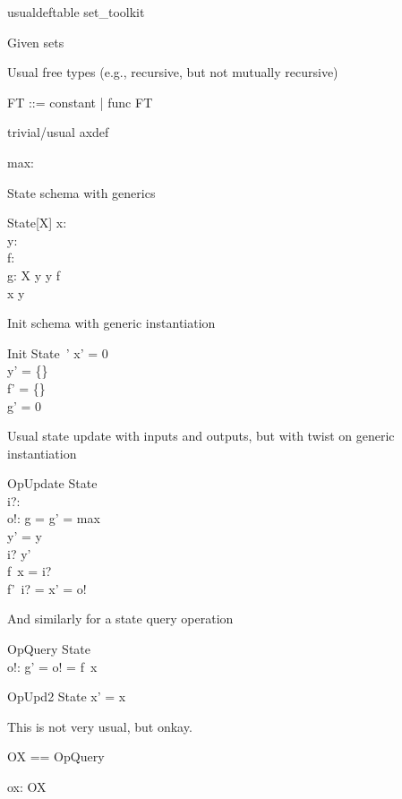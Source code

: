 \documentclass{article}
\begin{document}
\begin{zsection}
\SECTION usualdeftable \parents set\_toolkit
\end{zsection}

Given sets
\begin{zed}
   [G, H]
\end{zed}

Usual free types (e.g., recursive, but not mutually recursive)
\begin{zed}
   FT ::= constant | func \ldata \nat \cross FT \rdata
\end{zed}

trivial/usual axdef
\begin{axdef}
   max: \nat
\end{axdef}

State schema with generics
\begin{schema}{State}[X]
   x: \nat \\
   y: \power~\nat \\
   f: \nat \fun \nat \\
   g: X
\where
   y \cross y \subseteq f \\
   x \in y
\end{schema}

Init schema with generic instantiation
\begin{schema}{Init}
   State~'
\where
   x' = 0 \\
   y' = \{\} \\
   f' = \{\} \\
   g' = 0
\end{schema}

Usual state update with inputs and outputs, but with twist on generic instantiation
\begin{schema}{OpUpdate}
   \Delta State \\
   i?: \nat \\
   o!: \nat
\where
   g = g' = max \\ %
   y' = y \\
   i? \in y' \\
   f~x = i? \\
   f'~i? = x' = o!
\end{schema}

And similarly for a state query operation
\begin{schema}{OpQuery}
  \Xi State \\
  o!: \nat
\where
   g' = o! = f~x
\end{schema}

\begin{schema}{OpUpd2}
   \Delta State
\where
    x' = x
\end{schema}

This is not very usual, but onkay.
\begin{zed}
   OX == \pre OpQuery
\end{zed}

\begin{axdef}
   ox: OX
\end{axdef}
\end{document}
